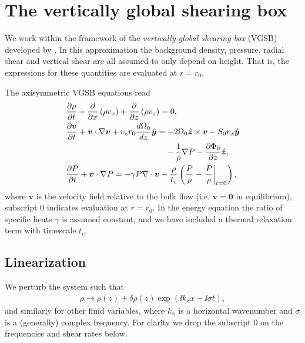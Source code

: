  \section{The vertically global shearing box} 
 We work within the framework of the \emph{vertically global shearing
   box} (VGSB) developed by \cite{mcnally14}. 
 In this approximation the background density, pressure, radial shear
 and vertical shear are all assumed to only 
 depend on height. That is, the expressions for these quantities are
 evaluated at $r=r_0$. 
 
 The axisymmetric VGSB equations read
 \begin{align}
   & \frac{\p\rho}{\p t} + \frac{\p}{\p x}\left(\rho v_x\right) +
   \frac{\p}{\p z}\left(\rho v_z\right)=0,\\
   & \frac{\p\bm{v}}{\p t} + \bm{v}\cdot\nabla\bm{v} +
   v_zr_0\frac{d\Omega_0}{dz} \hat{\bm{y}} = - 
   2\Omega_0\hat{\bm{z}}\times\bm{v} - S_0v_x\hat{\bm{y}} \notag\\ 
   &\phantom{\frac{\p\bm{v}}{\p t} + \bm{v}\cdot\nabla\bm{v} +
   v_zr_0\frac{d\Omega_0}{dz} \hat{\bm{y}}=}-\frac{1}{\rho}\nabla P - \frac{\p\Phi_0}{\p z}\hat{\bm{z}},\\
   & \frac{\p P}{\p t} + \bm{v}\cdot\nabla P = -\gamma P
   \nabla\cdot\bm{v} -
   \frac{\rho}{t_c}\left(\frac{P}{\rho}-\left.\frac{P}{\rho}\right|_{t=0}\right), 
 \end{align}
 where $\bm{v}$ is the velocity field relative to the bulk flow
 (i.e. $\bm{v}=\bm{0}$ in equilibrium),  
 subscript $0$ indicates evaluation at $r=r_0$. In the energy equation
 the ratio of specific heats $\gamma$ is assumed constant, 
 and we have included a thermal relaxation term with timescale $t_c$.  

 \subsection{Linearization}
 We perturb the system such that
 \begin{align}
   \rho \to \rho(z) + \delta\rho(z)\exp{\left(\ii k_x x - \ii\sigma
       t\right)},    
 \end{align}
 and similarly for other fluid variables, where $k_x$ is a horizontal
 wavenumber and $\sigma$ is a (generally) complex frequency. For
 clarity we drop the subscript $0$ on the frequencies and shear rates
 below. 
 
